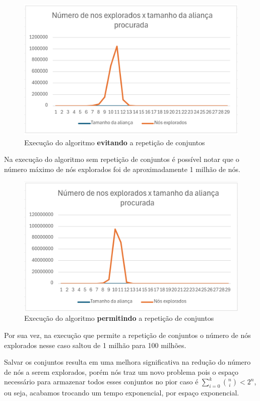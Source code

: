 \begin{figure}[!htb]
\centering
\includegraphics[width=12cm]{Execução sem repetição de conjuntos.png}
\caption{Execução do algoritmo \textbf{evitando} a repetição de conjuntos}
\label{fig:execucao-sem-repeticao}
\end{figure}

Na execução do algoritmo sem repetição de conjuntos é possível notar que o número máximo de nós explorados foi de aproximadamente 1 milhão de nós.

\begin{figure}[!htb]
\centering
\includegraphics[width=12cm]{Execução com repetição de conjuntos.png}
\caption{Execução do algoritmo \textbf{permitindo} a repetição de conjuntos}
\label{fig:execucao-com-repeticao}
\end{figure}

Por sua vez, na execução que permite a repetição de conjuntos o número de nós explorados nesse caso saltou de 1 milhão para 100 milhões.

Salvar os conjuntos resulta em uma melhora significativa na redução do número de nós a serem explorados, porém nós traz um novo problema pois o espaço necessário para armazenar todos esses conjuntos no pior caso é $\sum_{i=0}^{k} \binom{n}{i}<2^n$, ou seja, acabamos trocando um tempo exponencial, por espaço exponencial.

